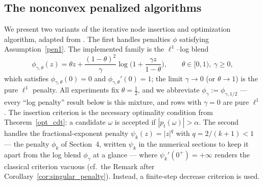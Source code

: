 \documentclass[11pt]{amsart}
\theoremstyle{definition}
\theoremstyle{remark}
\begin{document}
\subsection{The nonconvex penalized algorithms}
We present two variants of the iterative node insertion and optimization algorithm, adapted from \cite{pieper2022nonconvex}.
The first handles penalties $\phi$ satisfying Assumption~\ref{pen1}. The
implemented family is the $\ell^1$--log blend
\begin{equation*}
	\phi_{\gamma,\theta}(z) = \theta z
	+ \frac{(1-\theta)^2}{\gamma} \log\Big(1 + \frac{\gamma z}{1-\theta}\Big),
	\qquad \theta \in [0, 1),\ \gamma \ge 0,
\end{equation*}
which satisfies $\phi_{\gamma,\theta}(0) = 0$ and $\phi_{\gamma,\theta}'(0) = 1$;
the limit $\gamma \to 0$ (or $\theta \to 1$) is the pure $\ell^1$ penalty.
All experiments fix $\theta = \tfrac{1}{2}$, and we abbreviate
$\phi_{\gamma} := \phi_{\gamma,1/2}$ --- every ``log penalty'' result below is
this mixture, and rows with $\gamma = 0$ are pure $\ell^1$.
The insertion criterion is the necessary optimality condition from Theorem~\ref{opt_cdt}:
a candidate $\omega$ is accepted if $|p_t(\omega)| > \alpha$.
The second handles the fractional-exponent penalty $\psi_k(z) = |z|^q$ with $q = 2/(k+1) < 1$ --- the penalty $\phi_k$ of Section~4, written $\psi_k$ in the numerical sections to keep it apart from the log blend $\phi_{\gamma}$ at a glance ---
where $\psi_k'(0^+) = +\infty$ renders the classical criterion vacuous (cf.\ the Remark after Corollary~\ref{cor:singular_penalty}).
Instead, a finite-step decrease criterion is used.
\end{document}
